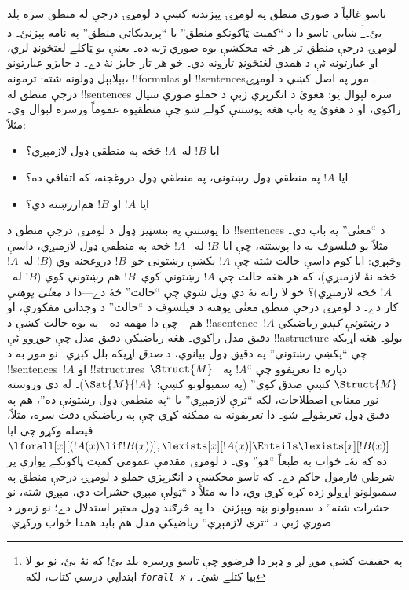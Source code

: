 \documentclass[../../../include/open-logic-section]{subfiles}
\begin{document}


تاسو غالباً د صوري منطق په لومړۍ پېژندنه کښې د لومړۍ درجې له منطق
سره بلد يئ۔\footnote{په حقيقت کښې موږ لږ و ډېر دا فرضوو چې تاسو
ورسره بلد يئ!{} که نۀ يئ، نو يو لا ابتدايي درسي کتاب، لکه
\emph{\texttt{forall x}} \citep{Magnus2021}، بيا کتلے شئ۔} ښايي تاسو دا د
``کميت ټاکونکو منطق'' يا ``پريديکاتي منطق'' په نامه پېژنئ۔ د لومړۍ
درجې منطق تر هر څه مخکښې يوه صوري ژبه ده۔ يعنې يو ټاکلے لغتځونډ
لري، او عبارتونه ئې د همدې لغتځونډ تارونه دي۔ خو هر تار جايز نۀ
دے۔ د جايزو عبارتونو بېلابېل ډولونه شته: ترمونه، !!{formula}s او
!!{sentence}s۔ موږ په اصل کښې د لومړۍ درجې منطق له !!{sentence}s
سره لېوال يو: هغوئ د انګرېزي ژبې د جملو صوري سيال راکوي، او د هغوئ
په باب هغه پوښتنې کولے شو چې منطقپوه عموماً ورسره لېوال وي۔ مثلاً:
\begin{itemize}
    \item ايا $!B$ له~$!A$ څخه په منطقي ډول لازمېږي؟
    \item ايا $!A$ په منطقي ډول رښتونې، په منطقي ډول دروغجنه، که
اتفاقي ده؟
    \item ايا $!A$ او $!B$ هم‌ارزښته دي؟
\end{itemize}

دا پوښتنې په بنسټيز ډول د لومړۍ درجې منطق د !!{sentence}s د
``معنٰی'' په باب دي۔ مثلاً يو فيلسوف به دا پوښتنه، چې ايا $!B$ له
~$!A$ څخه په منطقي ډول لازمېږي، داسې وڅېړي: ايا کوم داسې حالت شته
چې $!A$ پکښې رښتونې خو~$!B$ دروغجنه وي ($!B$ له~$!A$ څخه نۀ
لازمېږي)، که هر هغه حالت چې $!A$ رښتونې کوي~$!B$ هم رښتونې کوي
($!B$ له~$!A$ څخه لازمېږي)؟ خو لا راته نۀ دي ويل شوي چې ``حالت''
څۀ دے---دا د \emph{معنٰی پوهنې} کار دے۔ د لومړۍ درجې منطق معنٰی
پوهنه د فيلسوف د ``حالت'' د وجداني مفکورې، او هم---چې دا مهمه
ده---په يوه حالت کښې د !!a{sentence}~$!A$ د \emph{رښتونې کېدو}
رياضيکي دقيق مدل راکوي۔ هغه رياضيکي دقيق مدل چې جوړوو ئې
!!a{structure} بولو۔ هغه اړيکه چې ``پکښې رښتونې'' په دقيق ډول
بيانوي، د \emph{صدق} اړيکه بلل کېږي۔ نو موږ به د
!!{sentence}s~$!A$ او !!{structure}s~$\Struct{M}$ دپاره دا تعريفوو
چې ``$!A$ په~$\Struct{M}$ کښې صدق کوي'' (په سمبولونو کښې:
$\Sat{M}{!A}$)۔ له دې وروسته نور معنايي اصطلاحات، لکه ``ترې
لازمېږي'' يا ``په منطقي ډول رښتونې ده''، هم په دقيق ډول تعريفولے
شو۔ دا تعريفونه به ممکنه کړي چې په رياضيکي دقت سره، مثلاً، فيصله
وکړو چې ايا
$\lforall[x][(!A(x) \lif !B(x))], \lexists[x][!A(x)] \Entails \lexists[x][!B(x)]$
ده که نۀ۔ ځواب به طبعاً ``هو'' وي۔
د لومړۍ مقدمې عمومي کميت ټاکونکے يوازې پر شرطي فارمول حاکم دے۔
که تاسو مخکښې د
انګرېزي جملو د لومړۍ درجې منطق په سمبولونو اړولو زده کړه کړې وي، دا
به مثلاً د ``ټولې مېږي حشرات دي، مېږي شته، نو حشرات شته'' د
سمبولونو بڼه وپېژنئ۔ دا په څرګند ډول معتبر استدلال دے؛ نو زموږ د
صوري ژبې د ``ترې لازمېږي'' رياضيکي مدل هم بايد همدا ځواب ورکړي۔
\end{document}
